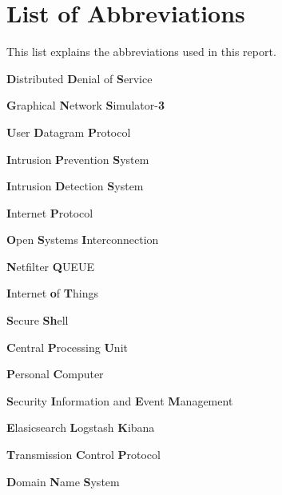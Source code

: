 \chapter*{List of Abbreviations}
This list explains the abbreviations used in this report.
\par
   \textbf{D}istributed \textbf{D}enial of \textbf{S}ervice\par
   \textbf{G}raphical \textbf{N}etwork \textbf{S}imulator-\textbf{3}\par 
   \textbf{U}ser \textbf{D}atagram \textbf{P}rotocol\par
   \textbf{I}ntrusion \textbf{P}revention \textbf{S}ystem\par
   \textbf{I}ntrusion \textbf{D}etection \textbf{S}ystem\par
   \textbf{I}nternet \textbf{P}rotocol\par
   \textbf{O}pen \textbf{S}ystems \textbf{I}nterconnection\par
   \textbf{N}etfilter \textbf{Q}UEUE\par
   \textbf{I}nternet \textbf{o}f \textbf{T}hings\par
   \textbf{S}ecure \textbf{Sh}ell\par
   \textbf{C}entral \textbf{P}rocessing \textbf{U}nit\par
   \textbf{P}ersonal \textbf{C}omputer\par
   \textbf{S}ecurity \textbf{I}nformation and \textbf{E}vent \textbf{M}anagement\par
   \textbf{E}lasicsearch \textbf{L}ogstash \textbf{K}ibana\par
  \textbf{T}ransmission \textbf{C}ontrol \textbf{P}rotocol\par
   \textbf{D}omain \textbf{N}ame \textbf{S}ystem\par
